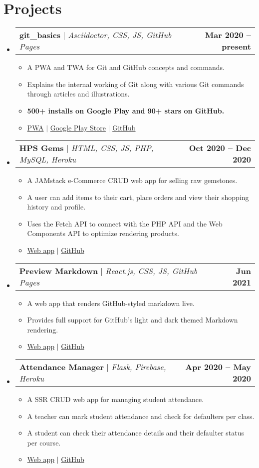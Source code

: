 \documentclass[letterpaper,11pt]{article}
\makeatletter
\newcommand{\resumeItem}[1]{
  \item\small{
    {#1 \vspace{-2pt}}
  }
}
\newcommand{\resumeProjectHeading}[2]{
    \item
    \begin{tabular*}{1.001\textwidth}{l@{\extracolsep{\fill}}r}
      \small#1 & \textbf{\small #2}\\
    \end{tabular*}\vspace{-7pt}
}
\newcommand{\resumeSubHeadingListStart}{\begin{itemize}[leftmargin=0.0in, label={}]}
\newcommand{\resumeSubHeadingListEnd}{\end{itemize}}
\newcommand{\resumeItemListStart}{\begin{itemize}}
\newcommand{\resumeItemListEnd}{\end{itemize}\vspace{-5pt}}
\makeatother
\begin{document}
\section{Projects}
    \vspace{-5pt}
    \resumeSubHeadingListStart
        \resumeProjectHeading
            {\textbf{\large{git\_basics}} $|$ \emph{Asciidoctor, CSS, JS, GitHub Pages}}{Mar 2020 -- present}
            \resumeItemListStart
                \resumeItem{A PWA and TWA for Git and GitHub concepts and commands.}
                \resumeItem{Explains the internal working of Git along with various Git commands through articles and illustrations.}
                \resumeItem{\textbf{500+ installs on Google Play and 90+ stars on GitHub.}}
                \resumeItem{\href{https://harshkapadia2.github.io/git_basics}{PWA} $|$  \href{https://play.google.com/store/apps/details?id=com.harsh_kapadia.git_basics}{Google Play Store} $|$ \href{https://github.com/HarshKapadia2/git_basics}{GitHub}}
            \resumeItemListEnd
        \vspace{-19pt}

        \resumeProjectHeading
            {\textbf{HPS Gems} $|$ \emph{HTML, CSS, JS, PHP, MySQL, Heroku}}{Oct 2020 -- Dec 2020}
            \resumeItemListStart
                \resumeItem{A JAMstack e-Commerce CRUD web app for selling raw gemstones.}
                \resumeItem{A user can add items to their cart, place orders and view their shopping history and profile.}
                \resumeItem{Uses the Fetch API to connect with the PHP API and the Web Components API to optimize rendering products.}
                \resumeItem{\href{https://hps-gems.herokuapp.com}{Web app} $|$ \href{https://github.com/HarshKapadia2/hps-gems}{GitHub}}
            \resumeItemListEnd
        \vspace{-19pt}
    
        \resumeProjectHeading
            {\textbf{Preview Markdown} $|$ \emph{React.js, CSS, JS, GitHub Pages}}{Jun 2021}
            \resumeItemListStart
                \resumeItem{A web app that renders GitHub-styled markdown live.}
                \resumeItem{Provides full support for GitHub's light and dark themed Markdown rendering.}
                \resumeItem{\href{https://harshkapadia2.github.io/preview-markdown}{Web app} $|$ \href{https://github.com/HarshKapadia2/preview-markdown}{GitHub}}
            \resumeItemListEnd
        \vspace{-19pt}

        \resumeProjectHeading
            {\textbf{Attendance Manager} $|$ \emph{Flask, Firebase, Heroku}}{Apr 2020 -- May 2020}
            \resumeItemListStart
                \resumeItem{A SSR CRUD web app for managing student attendance.}
                \resumeItem{A teacher can mark student attendance and check for defaulters per class.}
                \resumeItem{A student can check their attendance details and their defaulter status per course.}
                \resumeItem{\href{https://attendance-management-flask.herokuapp.com}{Web app} $|$ \href{https://github.com/HarshKapadia2/attendance_management}{GitHub}}
            \resumeItemListEnd
    \resumeSubHeadingListEnd
\vspace{-19pt}
\end{document}
